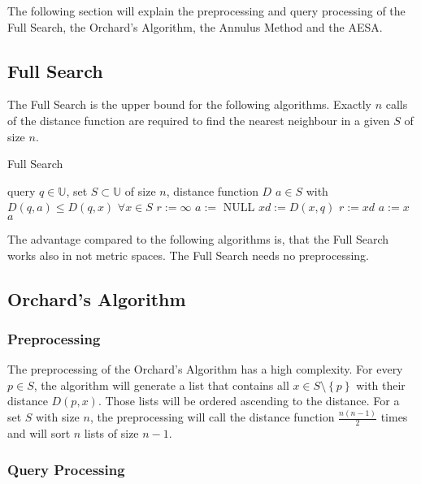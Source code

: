 \documentclass[runningheads,a4paper]{llncs}
\begin{document}
The following section will explain the preprocessing and query processing of the Full Search, the Orchard’s Algorithm,
the Annulus Method and the AESA.

\subsection{Full Search}

The Full Search is the upper bound for the following algorithms. Exactly $n$ calls of the distance function are required
to find the nearest neighbour in a given $S$ of size $n$.\\

\begin{algorithm}[H]
	\caption{Full Search}
	\label{fullsearch}
	\begin{algorithmic}
		\REQUIRE query $q \in \mathbb{U}$, set $S \subset \mathbb{U}$ of size $n$, distance function $D$
		\ENSURE $a \in S$ with $D(q, a) \le D(q, x)$ $\forall x \in S$
		\STATE $r := \infty$
		\STATE $a :=$ NULL
			\STATE $xd := D(x, q)$
				\STATE $r := xd$
				\STATE $a := x$
			\ENDIF
		\ENDFOR
		\RETURN $a$
	\end{algorithmic}
\end{algorithm}

The advantage compared to the following algorithms is, that the Full Search works also in not metric spaces. The Full
Search needs no preprocessing.

\subsection{Orchard’s Algorithm}

\subsubsection{Preprocessing}

The preprocessing of the Orchard’s Algorithm has a high complexity. For every $p \in S$, the algorithm will generate a
list that contains all $x \in S\setminus\left\{ {p}\right\}$ with their distance $D(p, x)$. Those lists will be ordered
ascending to the distance. For a set $S$ with size $n$, the preprocessing will call the distance function
$\frac{n(n-1)}{2}$ times and will sort $n$ lists of size $n-1$.

\subsubsection{Query Processing}
\end{document}
